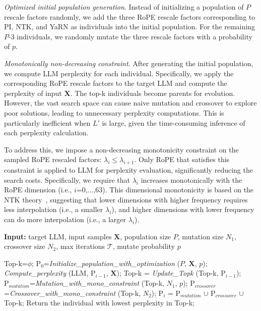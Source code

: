 \textit{Optimized initial population generation}. Instead of initializing a population  of $P$ rescale factors randomly, we add the three RoPE rescale factors corresponding to PI, NTK, and YaRN as individuals into the initial population. For the remaining $P$-3 individuals, we randomly mutate the three rescale factors with a probability of $p$. 

\textit{Monotonically non-decreasing constraint}. After generating the initial population, we compute LLM perplexity for each individual. Specifically, we apply the corresponding RoPE rescale factors to the target LLM and compute the perplexity of  input $\mathbf{X}$. The top-k individuals become parents for evolution. However, the vast search space can cause naive mutation and crossover to explore poor solutions, leading to unnecessary perplexity computations. This is particularly inefficient when $L'$ is large, given the time-consuming inference  of each perplexity calculation.

To address this, we impose a non-decreasing monotonicity constraint on the sampled RoPE rescaled factors: $\lambda_i\le \lambda_{i+1}$.
Only RoPE that satisfies this constraint is applied to LLM for perplexity evaluation, significantly reducing the search costs. Specifically,   we require that $\lambda_i$ increases monotonically with the RoPE dimension (i.e., $i$=0,...,63). This dimensional monotonicity is based on the NTK theory~\cite{jacot2018neural,tancik2020fourier,ntk}, suggesting that lower dimensions with higher frequency requires less interpolation (i.e., a smaller $\lambda_i$), and higher dimensions with lower frequency can do more interpolation (i.e.,  a larger $\lambda_i$).

\begin{algorithm}[t]
	\small
	\caption{The search algorithm}
	\textbf{Input:} target LLM, input samples $\mathbf{X}$,   population size $P$, mutation size $N_1$, crossover size $N_2$, max iterations $\mathcal{T}$, mutate probability $p$\\

	\begin{algorithmic}[1]
		\label{alg:search}
		\STATE Top-k=$\phi$;	
		\STATE $\text{P}_0$=\textit{Initialize\_population\_with\_optimization} ($P$, $\mathbf{X}$, $p$); 
		\STATE \textit{Compute\_perplexity} (LLM, $\text{P}_{i-1}$, $\mathbf{X}$);
		\STATE  Top-k = \textit{Update\_Topk} (Top-k, $\text{P}_{i-1}$);
		\STATE$\text{P}_{mutation}$=\textit{Mutation\_with\_mono\_constraint} (Top-k, $N_1$, $p$); 
		\STATE $\text{P}_{crossover}$=\textit{Crossover\_with\_mono\_constraint} (Top-k, $N_2$);
		\STATE $\text{P}_i$ = $\text{P}_{mutation}$ $\cup$ $\text{P}_{crossover}$ $\cup$ Top-k;
		\ENDFOR
		\STATE Return the individual with lowest perplexity in Top-k;
	\end{algorithmic}
\end{algorithm}

